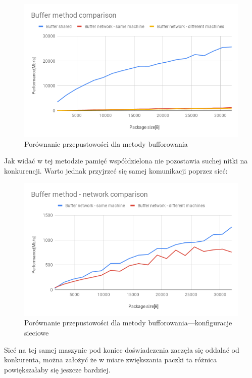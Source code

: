 \documentclass[11pt]{article}
\begin{document}
    \begin{figure}[H]
        \includegraphics[width=1\textwidth,frame]{charts/Buffer method comparison.png}
        \caption{Porównanie przepustowości dla metody bufforowania}
        \label{fig:buffer-comparison}
    \end{figure}

    Jak widać w tej metodzie pamięć współdzielona nie pozostawia suchej nitki na konkurencji.
    Warto jednak przyjrzeć się samej komunikacji poprzez sieć:

    \begin{figure}[H]
        \includegraphics[width=1\textwidth,frame]{charts/Buffer method - network comparison.png}
        \caption{Porównanie przepustowości dla metody bufforowania---konfiguracje sieciowe}
        \label{fig:buffer-net-comparison}
    \end{figure}

    Sieć na tej samej maszynie pod koniec doświadczenia zaczęła się oddalać od konkurenta, można
    założyć że w miare zwiększania paczki ta różnica powiększałaby się jeszcze bardziej.
\end{document}

